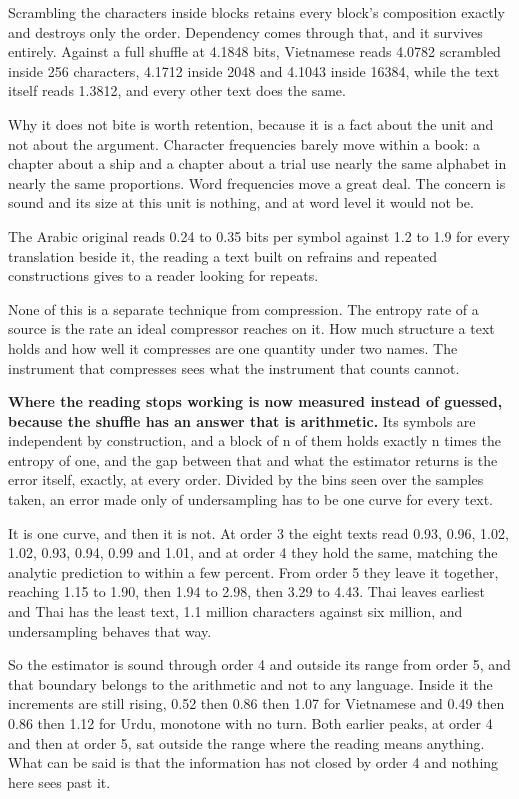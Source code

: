 Scrambling the characters inside blocks retains every block's composition exactly and destroys only the order. Dependency comes through that, and it survives entirely. Against a full shuffle at 4.1848 bits, Vietnamese reads 4.0782 scrambled inside 256 characters, 4.1712 inside 2048 and 4.1043 inside 16384, while the text itself reads 1.3812, and every other text does the same.

Why it does not bite is worth retention, because it is a fact about the unit and not about the argument. Character frequencies barely move within a book: a chapter about a ship and a chapter about a trial use nearly the same alphabet in nearly the same proportions. Word frequencies move a great deal. The concern is sound and its size at this unit is nothing, and at word level it would not be.

The Arabic original reads 0.24 to 0.35 bits per symbol against 1.2 to 1.9 for every translation beside it, the reading a text built on refrains and repeated constructions gives to a reader looking for repeats.

None of this is a separate technique from compression. The entropy rate of a source is the rate an ideal compressor reaches on it. How much structure a text holds and how well it compresses are one quantity under two names. The instrument that compresses sees what the instrument that counts cannot.

\textbf{Where the reading stops working is now measured instead of guessed, because the shuffle has an answer that is arithmetic.} Its symbols are independent by construction, and a block of n of them holds exactly n times the entropy of one, and the gap between that and what the estimator returns is the error itself, exactly, at every order. Divided by the bins seen over the samples taken, an error made only of undersampling has to be one curve for every text.

It is one curve, and then it is not. At order 3 the eight texts read 0.93, 0.96, 1.02, 1.02, 0.93, 0.94, 0.99 and 1.01, and at order 4 they hold the same, matching the analytic prediction to within a few percent. From order 5 they leave it together, reaching 1.15 to 1.90, then 1.94 to 2.98, then 3.29 to 4.43. Thai leaves earliest and Thai has the least text, 1.1 million characters against six million, and undersampling behaves that way.

So the estimator is sound through order 4 and outside its range from order 5, and that boundary belongs to the arithmetic and not to any language. Inside it the increments are still rising, 0.52 then 0.86 then 1.07 for Vietnamese and 0.49 then 0.86 then 1.12 for Urdu, monotone with no turn. Both earlier peaks, at order 4 and then at order 5, sat outside the range where the reading means anything. What can be said is that the information has not closed by order 4 and nothing here sees past it.

